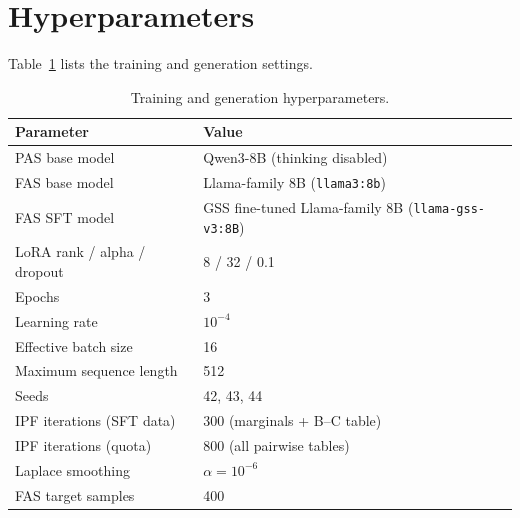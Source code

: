 \section{Hyperparameters}

Table~\ref{tab:hyper} lists the training and generation settings.

\begin{table}[h]
\centering
\small
\caption{Training and generation hyperparameters.}
\label{tab:hyper}
\begin{tabular}{ll}
\toprule
Parameter & Value \\
\midrule
PAS base model & Qwen3-8B (thinking disabled) \\
FAS base model & Llama-family 8B (\texttt{llama3:8b}) \\
FAS SFT model & GSS fine-tuned Llama-family 8B (\texttt{llama-gss-v3:8B}) \\
LoRA rank / alpha / dropout & 8 / 32 / 0.1 \\
Epochs & 3 \\
Learning rate & $10^{-4}$ \\
Effective batch size & 16 \\
Maximum sequence length & 512 \\
Seeds & 42, 43, 44 \\
IPF iterations (SFT data) & 300 (marginals + B--C table) \\
IPF iterations (quota) & 800 (all pairwise tables) \\
Laplace smoothing & $\alpha=10^{-6}$ \\
FAS target samples & 400 \\
\bottomrule
\end{tabular}
\end{table}
